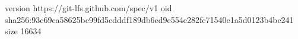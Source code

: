 version https://git-lfs.github.com/spec/v1
oid sha256:93c69ca58625bc99fd5cdddf189db6ed9e554e282fc71540e1a5d0123b4bc241
size 16634
